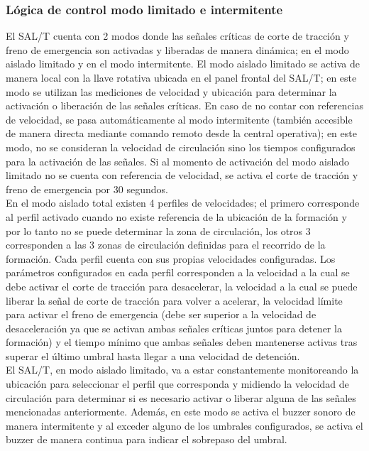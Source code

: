 \subsubsection{Lógica de control modo limitado e intermitente}


El SAL/T cuenta con 2 modos donde las señales críticas de corte de tracción y freno de emergencia son activadas y liberadas de manera dinámica; en el modo aislado limitado y en el modo intermitente. El modo aislado limitado se activa de manera local con la llave rotativa ubicada en el panel frontal del SAL/T; en este modo se utilizan las mediciones de velocidad y ubicación para determinar la activación o liberación de las señales críticas. En caso de no contar con referencias de velocidad, se pasa automáticamente al modo intermitente (también accesible de manera directa mediante comando remoto desde la central operativa); en este modo, no se consideran la velocidad de circulación sino los tiempos configurados para la activación de las señales. Si al momento de activación del modo aislado limitado no se cuenta con referencia de velocidad, se activa el corte de tracción y freno de emergencia por 30 segundos.\\ 


En el modo aislado total existen 4 perfiles de velocidades; el primero corresponde al perfil activado cuando no existe referencia de la ubicación de la formación y por lo tanto no se puede determinar la zona de circulación, los otros 3 corresponden a las 3 zonas de circulación definidas para el recorrido de la formación. Cada perfil cuenta con sus propias velocidades configuradas. Los parámetros configurados en cada perfil corresponden a la velocidad a la cual se debe activar el corte de tracción para desacelerar, la velocidad a la cual se puede liberar la señal de corte de tracción para volver a acelerar, la velocidad límite para activar el freno de emergencia (debe ser superior a la velocidad de desaceleración ya que se activan ambas señales críticas juntos para detener la formación) y el tiempo mínimo que ambas señales deben mantenerse activas tras superar el último umbral hasta llegar a una velocidad de detención. \\ 

El SAL/T, en modo aislado limitado, va a estar constantemente monitoreando la ubicación para seleccionar el perfil que corresponda y midiendo la velocidad de circulación para determinar si es necesario activar o liberar alguna de las señales mencionadas anteriormente. Además, en este modo se activa el buzzer sonoro de manera intermitente y al exceder alguno de los umbrales configurados, se activa el buzzer de manera continua para indicar el sobrepaso del umbral. \\



